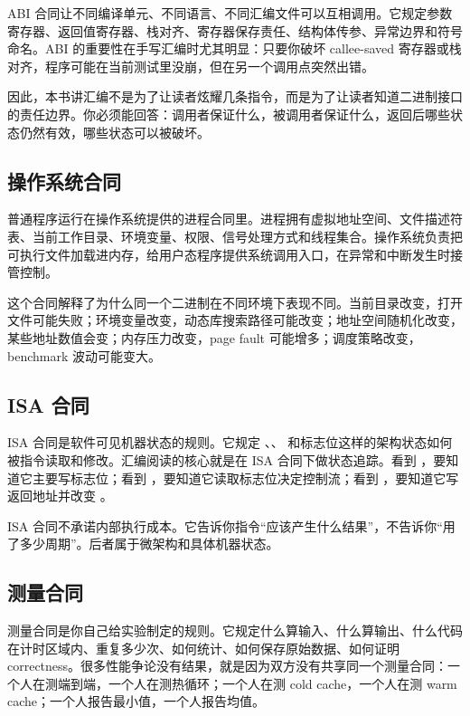 ABI 合同让不同编译单元、不同语言、不同汇编文件可以互相调用。它规定参数寄存器、返回值寄存器、栈对齐、寄存器保存责任、结构体传参、异常边界和符号命名。ABI 的重要性在手写汇编时尤其明显：只要你破坏 callee-saved 寄存器或栈对齐，程序可能在当前测试里没崩，但在另一个调用点突然出错。

因此，本书讲汇编不是为了让读者炫耀几条指令，而是为了让读者知道二进制接口的责任边界。你必须能回答：调用者保证什么，被调用者保证什么，返回后哪些状态仍然有效，哪些状态可以被破坏。

\subsection{操作系统合同}

普通程序运行在操作系统提供的进程合同里。进程拥有虚拟地址空间、文件描述符表、当前工作目录、环境变量、权限、信号处理方式和线程集合。操作系统负责把可执行文件加载进内存，给用户态程序提供系统调用入口，在异常和中断发生时接管控制。

这个合同解释了为什么同一个二进制在不同环境下表现不同。当前目录改变，打开文件可能失败；环境变量改变，动态库搜索路径可能改变；地址空间随机化改变，某些地址数值会变；内存压力改变，page fault 可能增多；调度策略改变，benchmark 波动可能变大。

\subsection{ISA 合同}

ISA 合同是软件可见机器状态的规则。它规定 、、 和标志位这样的架构状态如何被指令读取和修改。汇编阅读的核心就是在 ISA 合同下做状态追踪。看到 ，要知道它主要写标志位；看到 ，要知道它读取标志位决定控制流；看到 ，要知道它写返回地址并改变 。

ISA 合同不承诺内部执行成本。它告诉你指令“应该产生什么结果”，不告诉你“用了多少周期”。后者属于微架构和具体机器状态。

\subsection{测量合同}

测量合同是你自己给实验制定的规则。它规定什么算输入、什么算输出、什么代码在计时区域内、重复多少次、如何统计、如何保存原始数据、如何证明 correctness。很多性能争论没有结果，就是因为双方没有共享同一个测量合同：一个人在测端到端，一个人在测热循环；一个人在测 cold cache，一个人在测 warm cache；一个人报告最小值，一个人报告均值。

